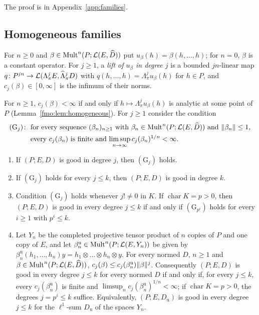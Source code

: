 The proof is in Appendix~\ref{app:families}.

\subsection{Homogeneous families}\label{fam2:ssec:reduction}

\begin{definition}\label{fam2:def:lifting}
For $n\ge0$ and $\beta\in\operatorname{Mult}^n(P;\mathcal L(E,\widehat D))$ put $u_\beta(h)=\beta(h,\dots,h)$; for $n=0$, $\beta$ is a constant
operator. For $j\ge1$, a \emph{lift of $u_\beta$ in degree $j$} is a bounded $jn$-linear map
$q\colon P^{jn}\to\mathcal L(\Lambda^j_\pi E,\widehat\Lambda^j_\pi D)$ with $q(h,\dots,h)=\Lambda^j_\pi u_\beta(h)$ for $h\in P$, and
$c_j(\beta)\in[0,\infty]$ is the infimum of their norms.
\end{definition}

For $n\ge1$, $c_j(\beta)<\infty$ if and only if $h\mapsto\Lambda^j_\pi u_\beta(h)$ is analytic at some point of $P$
(Lemma~\ref{fmo:lem:homogeneous}). For $j\ge1$ consider the condition
\begin{equation}\label{fam2:eq:G}
\begin{aligned}
 (\mathrm G_j)\colon\ &\text{for every sequence $(\beta_n)_{n\ge1}$ with $\beta_n\in\operatorname{Mult}^n(P;\mathcal L(E,\widehat D))$ and
 $\lVert \beta_n\rVert\le1$,}\\
 &\text{every $c_j(\beta_n)$ is finite and $\limsup_{n\to\infty}c_j(\beta_n)^{1/n}<\infty$.}
\end{aligned}
\end{equation}

\begin{theorem}\label{fam2:thm:reduction}
\begin{enumerate}
\item If $(P;E,D)$ is good in degree $j$, then $(\mathrm G_j)$ holds.
\item If $(\mathrm G_j)$ holds for every $j\le k$, then $(P;E,D)$ is good in degree $k$.
\item Condition $(\mathrm G_j)$ holds whenever $j!\ne0$ in $K$. If $\operatorname{char}K=p>0$, then $(P;E,D)$ is good in
every degree $j\le k$ if and only if $(\mathrm G_{p^i})$ holds for every $i\ge1$ with $p^i\le k$.
\item Let $Y_n$ be the completed projective tensor product of $n$ copies of $P$ and one copy of $E$, and let
$\beta^{\mathrm u}_n\in\operatorname{Mult}^n(P;\mathcal L(E,Y_n))$ be given by
$\beta^{\mathrm u}_n(h_1,\dots,h_n)y=h_1\otimes\dots\otimes h_n\otimes y$. For every normed $D$, $n\ge1$ and
$\beta\in\operatorname{Mult}^n(P;\mathcal L(E,\widehat D))$, $c_j(\beta)\le c_j(\beta^{\mathrm u}_n)\lVert \beta\rVert^j$. Consequently $(P;E,D)$ is good
in every degree $j\le k$ for every normed $D$ if and only if, for every $j\le k$, every $c_j(\beta^{\mathrm u}_n)$ is finite
and $\limsup_nc_j(\beta^{\mathrm u}_n)^{1/n}<\infty$; if $\operatorname{char}K=p>0$, the degrees $j=p^i\le k$ suffice.
Equivalently, $(P;E,D_{\mathrm u})$ is good in every degree $j\le k$ for the $\ell^1$-sum $D_{\mathrm u}$ of the spaces
$Y_n$.
\end{enumerate}
\end{theorem}


